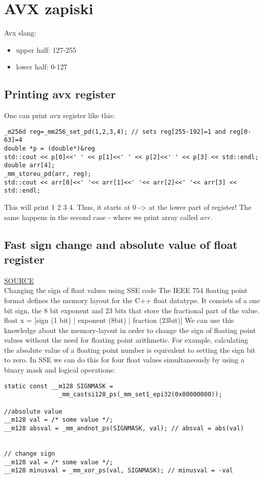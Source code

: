 \documentclass[openany, longbibliography,slovene,a4paper,12pt]{article}
\begin{document}
\section{AVX zapiski}
Avx slang:
\begin{itemize}
\item upper half: 127-255
\item lower half: 0-127 
\end{itemize}
\subsection{Printing avx register}
One can print avx register like this:
\begin{verbatim}
_m256d reg=_mm256_set_pd(1,2,3,4); // sets reg[255-192]=1 and reg[0-63]=4
double *p = (double*)&reg
std::cout << p[0]<<' ' << p[1]<<' ' << p[2]<<' ' << p[3] << std::endl;
double arr[4];
_mm_storeu_pd(arr, reg);
std::cout << arr[0]<<' '<< arr[1]<<' '<< arr[2]<<' '<< arr[3] << std::endl;
\end{verbatim}
This will print 1 2 3 4. Thus, it starts at 0 -> at the lower part of register!
The same happens in the second case - where we print array called $arr$.



\subsection{Fast sign change and absolute value of float register}
\href{http://fastcpp.blogspot.com/2011/03/changing-sign-of-float-values-using-sse.html}{SOURCE}
\\
Changing the sign of float values using SSE code
The IEEE 754 floating point format defines the memory layout for the C++ float datatype. It consists of a one bit sign, the 8 bit exponent and 23 bits that store the fractional part of the value. 
float x = [sign (1 bit) | exponent (8bit) | fraction (23bit)]
We can use this knowledge about the memory-layout in order to change the sign of floating point values without the need for floating point arithmetic. For example, calculating the absolute value of a floating point number is equivalent to setting the sign bit to zero. In SSE we can do this for four float values simultaneously by using a binary mask and logical operations:
\begin{verbatim}
static const __m128 SIGNMASK = 
               _mm_castsi128_ps(_mm_set1_epi32(0x80000000));

//absolute value
__m128 val = /* some value */;
__m128 absval = _mm_andnot_ps(SIGNMASK, val); // absval = abs(val)


// change sign
__m128 val = /* some value */;
__m128 minusval = _mm_xor_ps(val, SIGNMASK); // minusval = -val

\end{verbatim}
\end{document}
